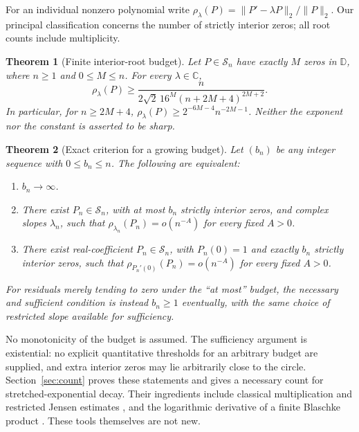 \documentclass[11pt]{article}
\newtheorem{theorem}{Theorem}
\theoremstyle{remark}\newtheorem{remark}[theorem]{Remark}
\newcommand{\D}{\mathbb D}
\newcommand{\C}{\mathbb C}
\newcommand{\norm}[1]{\lVert #1\rVert}
\begin{document}
For an individual nonzero polynomial write
\(\rho_\lambda(P)=\norm{P'-\lambda P}_2/\norm P_2\).
Our principal classification concerns the number of strictly interior
zeros; all root counts include multiplicity.

\begin{theorem}[Finite interior-root budget]\label{thm:count}
Let \(P\in\mathcal S_n\) have exactly \(M\) zeros in \(\D\),
where \(n\ge1\) and \(0\le M\le n\). For every \(\lambda\in\C\),
\begin{equation}\label{eq:count}
 \rho_\lambda(P)\ge
 \frac{n}{2\sqrt2\,16^M(n+2M+4)^{2M+2}}.
\end{equation}
In particular, for \(n\ge2M+4\),
\(\rho_\lambda(P)\ge2^{-6M-4}n^{-2M-1}\).
Neither the exponent nor the constant is asserted to be sharp.
\end{theorem}

\begin{theorem}[Exact criterion for a growing budget]\label{thm:budget}
Let \((b_n)\) be any integer sequence with \(0\le b_n\le n\).
The following are equivalent:
\begin{enumerate}
\item \(b_n\to\infty\).
\item There exist \(P_n\in\mathcal S_n\), with at most \(b_n\)
strictly interior zeros, and complex slopes \(\lambda_n\), such that
\(\rho_{\lambda_n}(P_n)=o(n^{-A})\) for every fixed \(A>0\).
\item There exist real-coefficient \(P_n\in\mathcal S_n\), with
\(P_n(0)=1\) and exactly \(b_n\) strictly interior zeros, such that
\(\rho_{P_n'(0)}(P_n)=o(n^{-A})\) for every fixed \(A>0\).
\end{enumerate}
For residuals merely tending to zero under the ``at most'' budget,
the necessary and sufficient condition is instead
\(b_n\ge1\) eventually, with the same choice of restricted slope
available for sufficiency.
\end{theorem}

No monotonicity of the budget is assumed. The sufficiency argument
is existential: no explicit quantitative thresholds for an arbitrary
budget are supplied, and extra interior zeros may lie arbitrarily
close to the circle. Section~\ref{sec:count} proves these statements
and gives a necessary count for stretched-exponential decay.
Their ingredients include classical multiplication and restricted
Jensen estimates \cite{brunault,haagerup,defant}, and the logarithmic
derivative of a finite Blaschke product \cite[Lemma 4.3]{kovalev}.
These tools themselves are not new.
\end{document}
